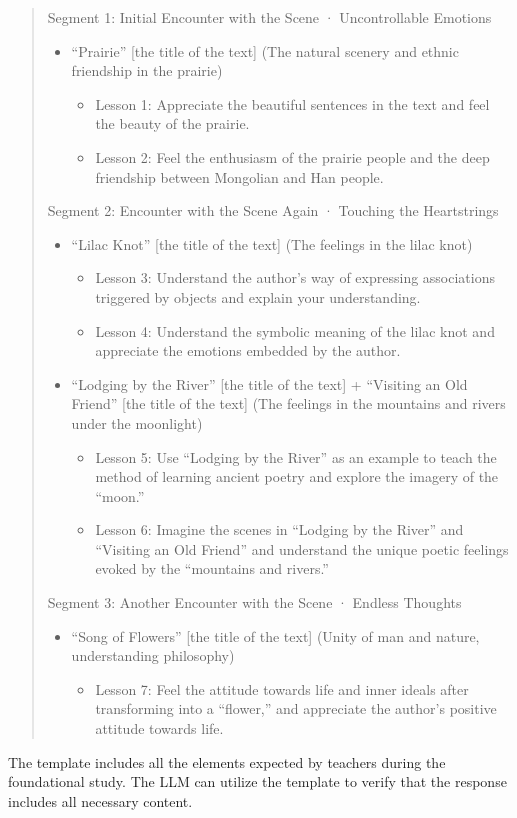 \begin{quote}
Segment 1: Initial Encounter with the Scene · Uncontrollable Emotions
\begin{itemize}
    \item ``Prairie'' [the title of the text] (The natural scenery and ethnic friendship in the prairie)
    \begin{itemize}
        \item Lesson 1: Appreciate the beautiful sentences in the text and feel the beauty of the prairie.
        \item Lesson 2: Feel the enthusiasm of the prairie people and the deep friendship between Mongolian and Han people.
    \end{itemize}
\end{itemize}

Segment 2: Encounter with the Scene Again · Touching the Heartstrings
\begin{itemize}
    \item ``Lilac Knot'' [the title of the text] (The feelings in the lilac knot)
    \begin{itemize}
        \item Lesson 3: Understand the author's way of expressing associations triggered by objects and explain your understanding.
        \item Lesson 4: Understand the symbolic meaning of the lilac knot and appreciate the emotions embedded by the author.
    \end{itemize}
    \item ``Lodging by the River'' [the title of the text] + ``Visiting an Old Friend'' [the title of the text] (The feelings in the mountains and rivers under the moonlight)
    \begin{itemize}
        \item Lesson 5: Use ``Lodging by the River'' as an example to teach the method of learning ancient poetry and explore the imagery of the ``moon.''
        \item Lesson 6: Imagine the scenes in ``Lodging by the River'' and ``Visiting an Old Friend'' and understand the unique poetic feelings evoked by the ``mountains and rivers.''
    \end{itemize}
\end{itemize}

Segment 3: Another Encounter with the Scene · Endless Thoughts
\begin{itemize}
    \item ``Song of Flowers'' [the title of the text] (Unity of man and nature, understanding philosophy)
    \begin{itemize}
        \item Lesson 7: Feel the attitude towards life and inner ideals after transforming into a ``flower,'' and appreciate the author's positive attitude towards life.
    \end{itemize}
\end{itemize}
\end{quote}

The template includes all the elements expected by teachers during the foundational study. The LLM can utilize the template to verify that the response includes all necessary content.
